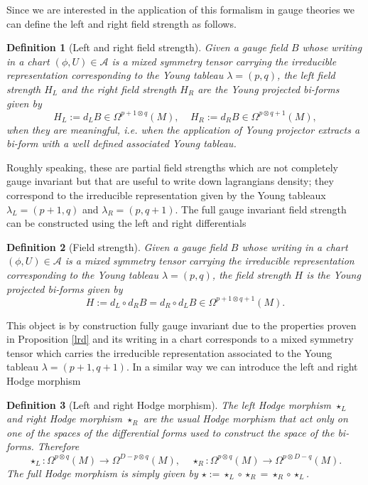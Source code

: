 \documentclass[a4paper,12pt]{article}
\newtheorem{Definition}{Definition}[section]
\begin{document}
Since we are interested in the application of this formalism in gauge theories we can define the left and right field strength as follows.
\begin{Definition}[Left and right field strength]
    \textit{Given a gauge field $B$ whose writing in a chart $(\phi,U) \in \mathcal{A}$ is a mixed symmetry tensor carrying the irreducible representation corresponding to the Young tableau $\lambda=(p,q)$, the left field strength $H_L$ and the right field strength $H_R$ are the Young projected bi-forms given by}
    \begin{equation}
        H_L:=d_L B \in \Omega^{p+1\otimes q}(M), \ \ \ \ \ H_R:=d_R B \in \Omega^{p\otimes q+1}(M),
    \end{equation}
    \textit{when they are meaningful, i.e. when the application of Young projector extracts a bi-form with a well defined associated Young tableau.}
\end{Definition}
Roughly speaking, these are partial field strengths 
which are not completely gauge invariant but that are useful to write down lagrangians density; they correspond to the irreducible representation given by the Young tableaux $\lambda_L=(p+1,q)$ and $\lambda_R=(p,q+1)$. The full gauge invariant field strength can be constructed using the left and right differentials
\begin{Definition}[Field strength]
    \textit{Given a gauge field $B$ whose writing in a chart $(\phi,U) \in \mathcal{A}$ is a mixed symmetry tensor carrying the irreducible representation corresponding to the Young tableau $\lambda=(p,q)$, the field strength $H$ is the Young projected bi-forms given by}
    \begin{equation}
        H:=d_L \circ d_R B= d_R \circ d_L B\in \Omega^{p+1\otimes q+1}(M).
    \end{equation}
\end{Definition}
This object is by construction fully gauge invariant due to the properties proven in Proposition \ref{lrd} and its writing in a chart corresponds to a mixed symmetry tensor which carries the irreducible representation associated to the Young tableau $\lambda=(p+1,q+1)$. In a similar way we can introduce the left and right Hodge morphism 
\begin{Definition}[Left and right Hodge morphism]
\textit{The left Hodge morphism $\star_L$ and right Hodge morphism $\star_R$ are the usual Hodge morphism that act only on one of the spaces of the differential forms used to construct the space of the bi-forms. Therefore}
    \begin{equation}
        \star_L: \Omega^{p \otimes q}(M) \rightarrow \Omega^{D-p\otimes q}(M), \ \ \ \ \ \star_R: \Omega^{p \otimes q}(M) \rightarrow \Omega^{p\otimes D-q}(M).
    \end{equation}
 \textit{The full Hodge morphism is simply given by $\star:=\star_L\circ \star_R=\star_R\circ \star_L$.}    
\end{Definition}
\end{document}
